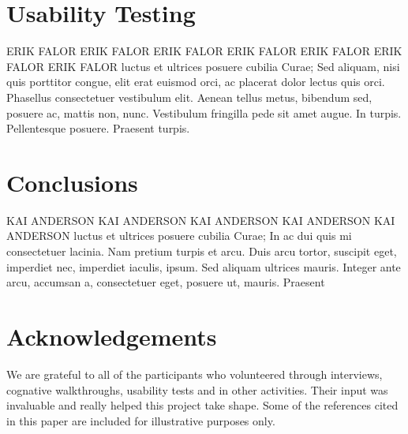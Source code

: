 \documentclass{sigchi-ext}
\begin{document}
\section{Usability Testing}
ERIK FALOR ERIK FALOR ERIK FALOR ERIK FALOR ERIK FALOR ERIK FALOR ERIK FALOR
luctus et ultrices posuere cubilia Curae; Sed aliquam, nisi quis
porttitor congue, elit erat euismod orci, ac placerat dolor lectus quis
orci. Phasellus consectetuer vestibulum elit. Aenean tellus metus,
bibendum sed, posuere ac, mattis non, nunc. Vestibulum fringilla pede
sit amet augue. In turpis. Pellentesque posuere. Praesent turpis.



\section{Conclusions}
KAI ANDERSON KAI ANDERSON KAI ANDERSON KAI ANDERSON KAI ANDERSON
luctus et ultrices posuere cubilia Curae; In ac dui quis mi
consectetuer lacinia.
Nam pretium turpis et arcu. Duis arcu tortor, suscipit eget, imperdiet
nec, imperdiet iaculis, ipsum. Sed aliquam ultrices mauris. Integer
ante arcu, accumsan a, consectetuer eget, posuere ut, mauris. Praesent



\section{Acknowledgements}
We are grateful to all of the participants who volunteered through interviews,
cognative walkthroughs, usability tests and in other activities. Their input
was invaluable and really helped this project take shape. Some of the
references cited in this paper are included for illustrative purposes only.



\balance{} 

% 

% 

\end{document}
